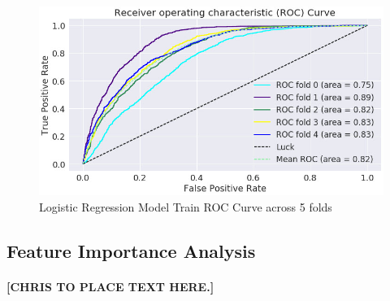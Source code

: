 \documentclass{article}
\begin{document}
\subparagraph{}
\begin{figure}[H]
\centering
\includegraphics[width=\linewidth]{ROCPlot.jpg}
\caption{Logistic Regression Model Train ROC Curve across 5 folds}
\label{fig:ROCPlot}
\end{figure}

\subsection{Feature Importance Analysis}

\paragraph{[CHRIS TO PLACE TEXT HERE.]}
\end{document}
